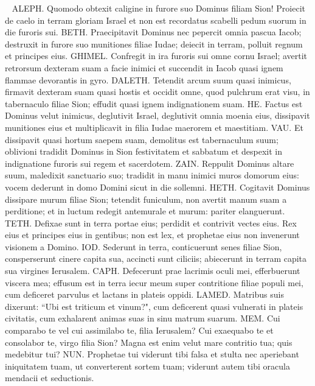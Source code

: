 \begin{biblechapter}   
\verse ALEPH. Quomodo obtexit caligine in furore suo Dominus filiam Sion! Proiecit de caelo in terram gloriam Israel et non est recordatus scabelli pedum suorum in die furoris sui. 
\verse BETH. Praecipitavit Dominus nec pepercit omnia pascua Iacob; destruxit in furore suo munitiones filiae Iudae; deiecit in terram, polluit regnum et principes eius. 
\verse GHIMEL. Confregit in ira furoris sui omne cornu Israel; avertit retrorsum dexteram suam a facie inimici et succendit in Iacob quasi ignem flammae devorantis in gyro. 
\verse DALETH. Tetendit arcum suum quasi inimicus, firmavit dexteram suam quasi hostis et occidit omne, quod pulchrum erat visu, in tabernaculo filiae Sion; effudit quasi ignem indignationem suam. 
\verse HE. Factus est Dominus velut inimicus, deglutivit Israel, deglutivit omnia moenia eius, dissipavit munitiones eius et multiplicavit in filia Iudae maerorem et maestitiam. 
\verse VAU. Et dissipavit quasi hortum saepem suam, demolitus est tabernaculum suum; oblivioni tradidit Dominus in Sion festivitatem et sabbatum et despexit in indignatione furoris sui regem et sacerdotem. 
\verse ZAIN. Reppulit Dominus altare suum, maledixit sanctuario suo; tradidit in manu inimici muros domorum eius: vocem dederunt in domo Domini sicut in die sollemni. 
\verse HETH. Cogitavit Dominus dissipare murum filiae Sion; tetendit funiculum, non avertit manum suam a perditione; et in luctum redegit antemurale et murum: pariter elanguerunt. 
\verse TETH. Defixae sunt in terra portae eius; perdidit et contrivit vectes eius. Rex eius et principes eius in gentibus; non est lex, et prophetae eius non invenerunt visionem a Domino. 
\verse IOD. Sederunt in terra, conticuerunt senes filiae Sion, consperserunt cinere capita sua, accincti sunt ciliciis; abiecerunt in terram capita sua virgines Ierusalem. 
\verse CAPH. Defecerunt prae lacrimis oculi mei, efferbuerunt viscera mea; effusum est in terra iecur meum super contritione filiae populi mei, cum deficeret parvulus et lactans in plateis oppidi. 
\verse LAMED. Matribus suis dixerunt: “Ubi est triticum et vinum?", cum deficerent quasi vulnerati in plateis civitatis, cum exhalarent animas suas in sinu matrum suarum. 
\verse MEM. Cui comparabo te vel cui assimilabo te, filia Ierusalem? Cui exaequabo te et consolabor te, virgo filia Sion? Magna est enim velut mare contritio tua; quis medebitur tui? 
\verse NUN. Prophetae tui viderunt tibi falsa et stulta nec aperiebant iniquitatem tuam, ut converterent sortem tuam; viderunt autem tibi oracula mendacii et seductionis. 

\end{biblechapter}
